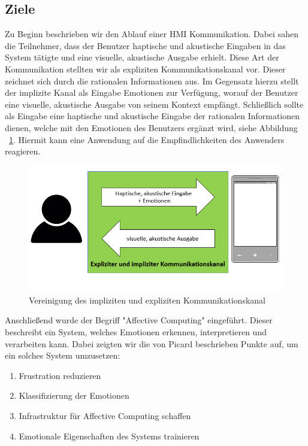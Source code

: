 \subsection{Ziele}

Zu Beginn beschrieben wir den Ablauf einer \ac{HMI} Kommunikation. Dabei sahen die Teilnehmer, dass der Benutzer haptische und akustische Eingaben in das System tätigte und eine visuelle, akustische Ausgabe erhielt. Diese Art der Kommunikation stellten wir als expliziten Kommunikationskanal vor. Dieser zeichnet sich durch die rationalen Informationen aus. Im Gegensatz hierzu stellt der implizite Kanal als Eingabe Emotionen zur Verfügung, worauf der Benutzer eine visuelle, akustische Ausgabe von seinem Kontext empfängt. Schließlich sollte als Eingabe eine haptische und akustische Eingabe der rationalen Informationen dienen, welche mit den Emotionen des Benutzers ergänzt wird, siehe Abbildung ~\ref{fig:communiationskanal}. Hiermit kann eine Anwendung auf die Empfindlichkeiten des Anwenders reagieren. 

\begin{figure}[!h]
	\centering
	\includegraphics[width=0.9\linewidth]{Pictures/impliziter_expliziter_Kanal}
	\caption[Vereinigung des impliziten und expliziten Kommunikationskanal]{Vereinigung des impliziten und expliziten Kommunikationskanal}
	\label{fig:communiationskanal}
\end{figure}  

Anschließend wurde der Begriff "Affective Computing" eingeführt. Dieser beschreibt ein System, welches Emotionen erkennen, interpretieren und verarbeiten kann. Dabei zeigten wir die von Picard beschrieben Punkte auf, um ein solches System umzusetzen\cite{Picard}:

\vspace{2mm}
\begin{enumerate}
	\item Frustration reduzieren
	\item Klassifizierung der Emotionen
	\item Infrastruktur für Affective Computing schaffen
	\item Emotionale Eigenschaften des Systems trainieren
\end{enumerate}
\vspace{2mm}

